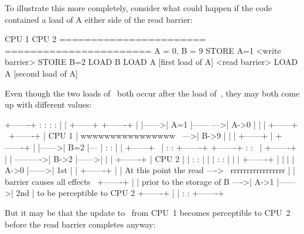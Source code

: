 To illustrate this more completely, consider what could happen if the code
contained a load of A either side of the read barrier:

\begin{VerbatimU}
	CPU 1                   CPU 2
	=======================	=======================
		{ A = 0, B = 9 }
	STORE A=1
	<write barrier>
	STORE B=2
	                        LOAD B
	                        LOAD A [first load of A]
	                        <read barrier>
	                        LOAD A [second load of A]
\end{VerbatimU}

Even though the two loads of~ both occur after the load of~,
they may both come up with different values:

\begin{VerbatimU}
	+-------+       :      :                :       :
	|       |       +------+                +-------+
	|       |------>| A=1  |------      --->| A->0  |
	|       |       +------+      \         +-------+
	| CPU 1 |   wwwwwwwwwwwwwwww   \    --->| B->9  |
	|       |       +------+        |       +-------+
	|       |------>| B=2  |---     |       :       :
	|       |       +------+   \    |       :       :       +-------+
	+-------+       :      :    \   |       +-------+       |       |
	                             ---------->| B->2  |------>|       |
	                                |       +-------+       | CPU 2 |
	                                |       :       :       |       |
	                                |       :       :       |       |
	                                |       +-------+       |       |
	                                |       | A->0  |------>| 1st   |
	                                |       +-------+       |       |
	  At this point the read ---->   \  rrrrrrrrrrrrrrrrr   |       |
	  barrier causes all effects      \     +-------+       |       |
	  prior to the storage of B        ---->| A->1  |------>| 2nd   |
	  to be perceptible to CPU 2            +-------+       |       |
	                                        :       :       +-------+
\end{VerbatimU}

But it may be that the update to~ from CPU~1 becomes perceptible to CPU~2
before the read barrier completes anyway:

